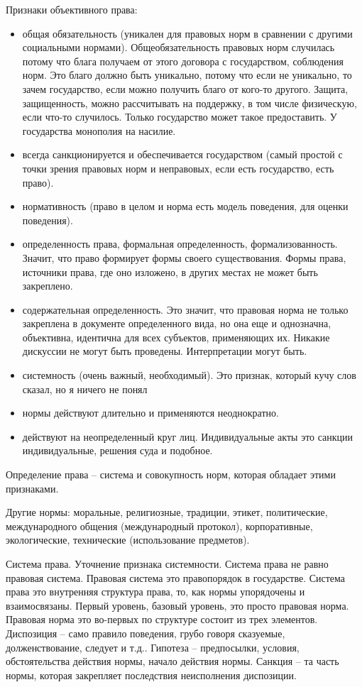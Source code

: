 \documentclass[a4paper, 12pt]{article}
\begin{document}
Признаки объективного права: 
\begin{itemize}
\item общая обязательность (уникален для правовых норм в сравнении с другими социальными нормами). 
Общеобязательность правовых норм случилась потому что блага получаем от этого договора с государством, соблюдения норм. Это благо должно быть уникально, потому что если не уникально, то зачем государство, если можно получить благо от кого-то другого. Защита, защищенность, можно рассчитывать на поддержку, в том числе физическую, если что-то случилось. Только государство может такое предоставить. У государства монополия на насилие. 

\item всегда санкционируется и обеспечивается государством (самый простой с точки зрения правовых норм и неправовых, если есть государство, есть право).
\item нормативность (право в целом и норма есть модель поведения, для оценки поведения).
\item определенность права, формальная определенность, формализованность. Значит, что право формирует формы своего существования. Формы права, источники права, где оно изложено, в других местах не может быть закреплено. 
\item содержательная определенность. Это значит, что правовая норма не только закреплена в документе определенного вида, но она еще и однозначна, объективна, идентична для всех субъектов, применяющих их. Никакие дискуссии не могут быть проведены. Интерпретации могут быть. 
\item системность (очень важный, необходимый). Это признак, который кучу слов сказал, но я ничего не понял 
\item нормы действуют длительно и применяются неоднократно. 
\item действуют на неопределенный круг лиц. Индивидуальные акты это санкции индивидуальные, решения суда и подобное. 
\end{itemize}

Определение права -- система и совокупность норм, которая обладает этими признаками. 

Другие нормы: моральные, религиозные, традиции, этикет, политические, международного общения (международный протокол), корпоративные, экологические, технические (использование предметов). 

Система права. Уточнение признака системности. Система права не равно правовая система. Правовая система это правопорядок в государстве. Система права это внутренняя структура права, то, как нормы упорядочены и взаимосвязаны. Первый уровень, базовый уровень, это просто правовая норма. Правовая норма это во-первых по структуре состоит из трех элементов. Диспозиция -- само правило поведения, грубо говоря сказуемые, долженствование, следует и т.д.. Гипотеза -- предпосылки, условия, обстоятельства действия нормы, начало действия нормы. Санкция -- та часть нормы, которая закрепляет последствия неисполнения диспозиции. 
\end{document}
